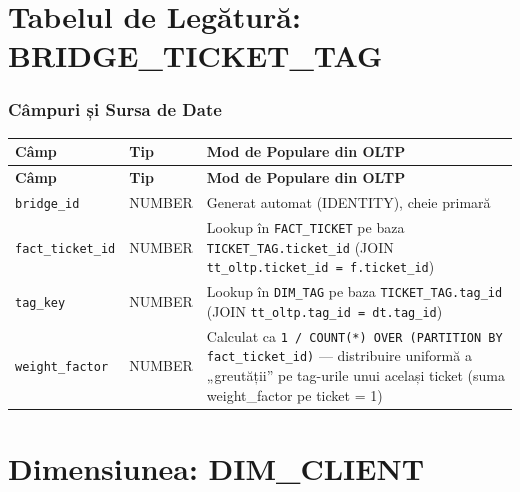 \section{Tabelul de Legătură: BRIDGE\_TICKET\_TAG}

\subsubsection{Câmpuri și Sursa de Date}

\begin{longtable}{|>{\raggedright\arraybackslash}p{3.5cm}|>{\raggedright\arraybackslash}p{2.8cm}|>{\raggedright\arraybackslash}p{8.7cm}|}
\hline
\textbf{Câmp} & \textbf{Tip} & \textbf{Mod de Populare din OLTP} \\
\hline
\endfirsthead
\hline
\textbf{Câmp} & \textbf{Tip} & \textbf{Mod de Populare din OLTP} \\
\hline
\endhead
\hline
\endfoot
\hline
\endlastfoot

\texttt{bridge\_id} & NUMBER & Generat automat (IDENTITY), cheie primară \\
\hline
\texttt{fact\_ticket\_id} & NUMBER & Lookup în \texttt{FACT\_TICKET} pe baza \texttt{TICKET\_TAG.ticket\_id} (JOIN \texttt{tt\_oltp.ticket\_id = f.ticket\_id}) \\
\hline
\texttt{tag\_key} & NUMBER & Lookup în \texttt{DIM\_TAG} pe baza \texttt{TICKET\_TAG.tag\_id} (JOIN \texttt{tt\_oltp.tag\_id = dt.tag\_id}) \\
\hline
\texttt{weight\_factor} & NUMBER & Calculat ca \texttt{1 / COUNT(*) OVER (PARTITION BY fact\_ticket\_id)} — distribuire uniformă a „greutății” pe tag-urile unui același ticket (suma weight\_factor pe ticket = 1) \\
\hline
\end{longtable}

\section{Dimensiunea: DIM\_CLIENT}

